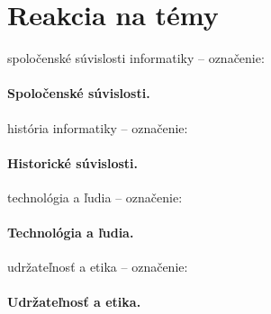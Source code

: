 \documentclass[10pt,twoside,slovak,a4paper]{article}
\begin{document}
\section{Reakcia na témy}
spoločenské súvislosti informatiky – označenie: \paragraph{Spoločenské súvislosti.}
história informatiky – označenie: \paragraph{Historické súvislosti.}
technológia a ľudia – označenie: \paragraph{Technológia a ľudia.}
udržateľnosť a etika – označenie: \paragraph{Udržateľnosť a etika.}



%



\end{document}
